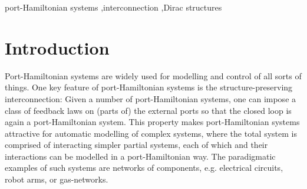 \documentclass[preprint,12pt]{elsarticle}
\theoremstyle{definition}
\begin{document}
\begin{frontmatter}
\begin{keyword}
port-Hamiltonian systems \sep interconnection \sep Dirac structures



\end{keyword}

\end{frontmatter}




\section{Introduction}

Port-Hamiltonian systems are widely used for modelling and control of all sorts of things. One key feature of port-Hamiltonian systems is the structure-preserving interconnection: Given a number of port-Hamiltonian systems, one can impose a class of feedback laws on (parts of) the external ports so that the closed loop is again a port-Hamiltonian system. This property makes port-Hamiltonian systems attractive for automatic modelling of complex systems, where the total system is comprised of interacting simpler partial systems, each of which and their interactions can be modelled in a port-Hamiltonian way. The paradigmatic examples of such systems are networks of components, e.g. electrical circuits, robot arms, or gas-networks.
\end{document}
